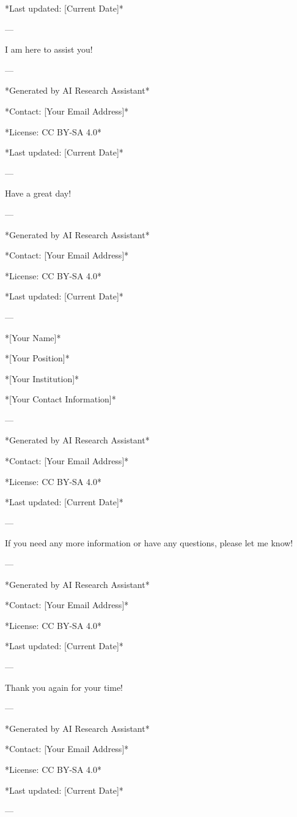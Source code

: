 *Last updated: [Current Date]* 

--- 

I am here to assist you! 

--- 

*Generated by AI Research Assistant* 

*Contact: [Your Email Address]* 

*License: CC BY-SA 4.0* 

*Last updated: [Current Date]* 

--- 

Have a great day! 

--- 

*Generated by AI Research Assistant* 

*Contact: [Your Email Address]* 

*License: CC BY-SA 4.0* 

*Last updated: [Current Date]* 

--- 

*[Your Name]* 

*[Your Position]* 

*[Your Institution]* 

*[Your Contact Information]* 

--- 

*Generated by AI Research Assistant* 

*Contact: [Your Email Address]* 

*License: CC BY-SA 4.0* 

*Last updated: [Current Date]* 

--- 

If you need any more information or have any questions, please let me know! 

--- 

*Generated by AI Research Assistant* 

*Contact: [Your Email Address]* 

*License: CC BY-SA 4.0* 

*Last updated: [Current Date]* 

--- 

Thank you again for your time! 

--- 

*Generated by AI Research Assistant* 

*Contact: [Your Email Address]* 

*License: CC BY-SA 4.0* 

*Last updated: [Current Date]* 

--- 

